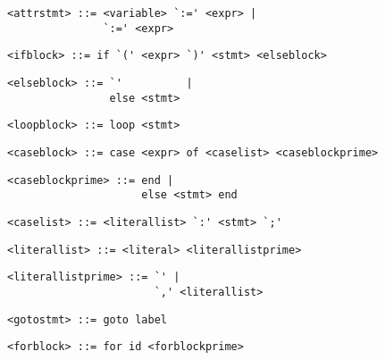 \begin{footnotesize}
\begin{lstlisting}[frame=single, label={attrstmt}, language=pie]
<attrstmt> ::= <variable> `:=' <expr> |
               `:=' <expr>
\end{lstlisting}

\begin{lstlisting}[frame=single, label={ifblock}, language=pie]
<ifblock> ::= if `(' <expr> `)' <stmt> <elseblock> 
\end{lstlisting}


\begin{lstlisting}[frame=single, label={elseblock}, language=pie]
<elseblock> ::= `'          |
                else <stmt>
\end{lstlisting}

\begin{lstlisting}[frame=single, label={loopblock}, language=pie]
<loopblock> ::= loop <stmt>
\end{lstlisting}

\begin{lstlisting}[frame=single, label={caseblock}, language=pie]
<caseblock> ::= case <expr> of <caselist> <caseblockprime>
\end{lstlisting}

\begin{lstlisting}[frame=single, label={caseblockprime}, language=pie]
<caseblockprime> ::= end |
                     else <stmt> end
\end{lstlisting}

\begin{lstlisting}[frame=single, label={caselist}, language=pie]
<caselist> ::= <literallist> `:' <stmt> `;'
\end{lstlisting}

\begin{lstlisting}[frame=single, label={literallist}, language=pie]
<literallist> ::= <literal> <literallistprime>
\end{lstlisting}

\begin{lstlisting}[frame=single, label={literallistprime}, language=pie]
<literallistprime> ::= `' |
                       `,' <literallist> 
\end{lstlisting}

\begin{lstlisting}[frame=single, label={gotostmt}, language=pie]
<gotostmt> ::= goto label
\end{lstlisting}

\begin{lstlisting}[frame=single, label={forblock}, language=pie]
<forblock> ::= for id <forblockprime>
\end{lstlisting}


\end{footnotesize}
